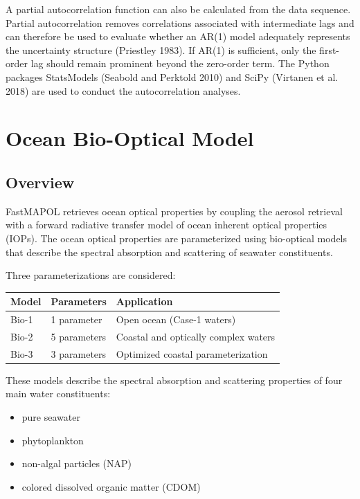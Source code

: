\documentclass[
  11pt,
  letterpaper,
  DIV=11,
  numbers=noendperiod]{scrreprt}
\providecommand{\tightlist}{%
  \setlength{\itemsep}{0pt}\setlength{\parskip}{0pt}}
\begin{document}
A partial autocorrelation function can also be calculated from the data
sequence. Partial autocorrelation removes correlations associated with
intermediate lags and can therefore be used to evaluate whether an AR(1)
model adequately represents the uncertainty structure (Priestley 1983).
If AR(1) is sufficient, only the first-order lag should remain prominent
beyond the zero-order term. The Python packages StatsModels (Seabold and
Perktold 2010) and SciPy (Virtanen et al. 2018) are used to conduct the
autocorrelation analyses.

\chapter{Ocean Bio-Optical Model}\label{ocean-bio-optical-model}

\section{Overview}\label{overview-3}

FastMAPOL retrieves ocean optical properties by coupling the aerosol
retrieval with a forward radiative transfer model of ocean inherent
optical properties (IOPs). The ocean optical properties are
parameterized using bio-optical models that describe the spectral
absorption and scattering of seawater constituents.

Three parameterizations are considered:

\begin{longtable}[]{@{}lll@{}}
\toprule\noalign{}
Model & Parameters & Application \\
\midrule\noalign{}
\endhead
\bottomrule\noalign{}
\endlastfoot
Bio-1 & 1 parameter & Open ocean (Case-1 waters) \\
Bio-2 & 5 parameters & Coastal and optically complex waters \\
Bio-3 & 3 parameters & Optimized coastal parameterization \\
\end{longtable}

These models describe the spectral absorption and scattering properties
of four main water constituents:

\begin{itemize}
\tightlist
\item
  pure seawater
\item
  phytoplankton
\item
  non-algal particles (NAP)
\item
  colored dissolved organic matter (CDOM)
\end{itemize}
\end{document}
